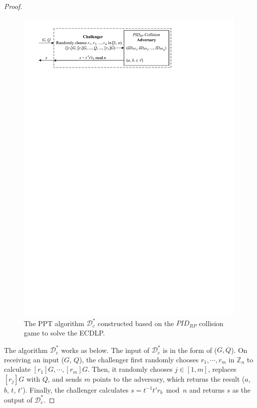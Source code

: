 \begin{proof}
    \begin{figure}[tb]
      \centering
      \includegraphics[width=0.96\linewidth]{fig/ecdlp_algorithm.pdf}
      \caption{The PPT algorithm $\mathcal{D}^*_c$ constructed based on the $PID_{RP}$ collision game to solve the ECDLP.}
      \label{fig:ecdlp_algorithm}
    \end{figure}
  
    The algorithm $\mathcal{D}^*_c$ works as below.
    The input of $\mathcal{D}^*_c$ is in the form of ($G, Q$). 
    On receiving an input ($G$, $Q$), 
    the challenger first randomly chooses $r_1, \cdots, r_m$ in $\mathbb{Z}_n$ to calculate $[r_1]G, \cdots, [r_m]G$.
    Then, it randomly chooses $j \in [1,m]$, replaces $[r_j]G$ with $Q$, and sends $m$ points to the adversary, 
    which returns the result ($a$, $b$, $t$, $t'$). 
    Finally, the challenger calculates $s = t^{-1}t'r_b \bmod n$ and returns $s$ as the output of $\mathcal{D}^*_c$.
  

\end{proof}
